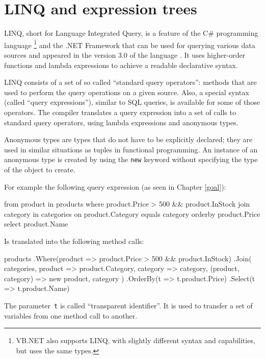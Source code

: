 \section{LINQ and expression trees}

\acs{LINQ}, short for Language Integrated Query, is a feature of the C\# programming language%
\footnote{\ac{VB.NET} also supports \ac{LINQ}, with slightly different syntax
and capabilities, but uses the same types.}
and the .NET Framework that can be used for querying various data sources
and appeared in the version 3.0 of the language \cite{cs-in-depth}.
It uses higher-order functions and lambda expressions to achieve a readable declarative syntax.

\ac{LINQ} consists of a set of so called “standard query operators”:
methods that are used to perform the query operations on a given source.
Also, a special syntax (called “query expressions”), similar to \ac{SQL} queries, is available
for some of those operators.
The compiler translates a query expression into a set of calls to standard query operators,
using lambda expressions and anonymous types.

Anonymous types are types that do not have to be explicitly declared;
they are used in similar situations as tuples in functional programming.
An instance of an anonymous type is created by using the \lstinline{new} keyword
without specifying the type of the object to create.

For example the following query expression (as seen in Chapter \ref{goal}):

\nopagebreak

\begin{code}
from product in products
where product.Price > 500
   && product.InStock
join category in categories on product.Category equals category
orderby product.Price
select product.Name
\end{code}

Is translated into the following method calls:

\begin{code}
products
    .Where(product => product.Price > 500 && product.InStock)
    .Join(
        categories,
        product => product.Category,
        category => category,
        (product, category) => new { product, category })
    .OrderBy(t => t.product.Price)
    .Select(t => t.product.Name)
\end{code}

The parameter~\lstinline,t, is called “transparent identifier”. It is used to transfer a set of variables from one method call to another.

